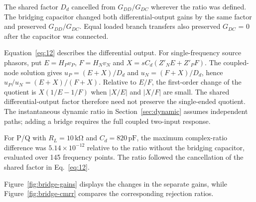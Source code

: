 The shared factor \(D_d\) cancelled from \(G_{DD}/G_{DC}\) wherever the ratio was defined. The bridging capacitor changed both differential-output gains by the same factor and preserved \(G_{DD}/G_{DC}\). Equal loaded branch transfers also preserved \(G_{DC}\) = 0 after the capacitor was connected.

Equation~\eqref{eq:12} describes the differential output. For single-frequency source phasors, put $E=H_Pv_P$, $F=H_Nv_N$ and $X=sC_d(Z'_NE+Z'_PF)$. The coupled-node solution gives $u_P=(E+X)/D_d$ and $u_N=(F+X)/D_d$, hence $u_P/u_N=(E+X)/(F+X)$. Relative to $E/F$, the first-order change of the quotient is $X(1/E-1/F)$ when $|X/E|$ and $|X/F|$ are small. The shared differential-output factor therefore need not preserve the single-ended quotient. The instantaneous dynamic ratio in Section~\ref{sec:dynamic} assumes independent paths; adding a bridge requires the full coupled two-input response.

For P/Q with \(R_L=10\,\mathrm{k\Omega}\) and \(C_d=820\,\mathrm{pF}\), the maximum complex-ratio difference was \(5.14\times10^{-12}\) relative to the ratio without the bridging capacitor, evaluated over 145 frequency points. The ratio followed the cancellation of the shared factor in Eq.~\eqref{eq:12}.


Figure~\ref{fig:bridge-gains} displays the changes in the separate gains, while Figure~\ref{fig:bridge-cmrr} compares the corresponding rejection ratios.





\FloatBarrier


